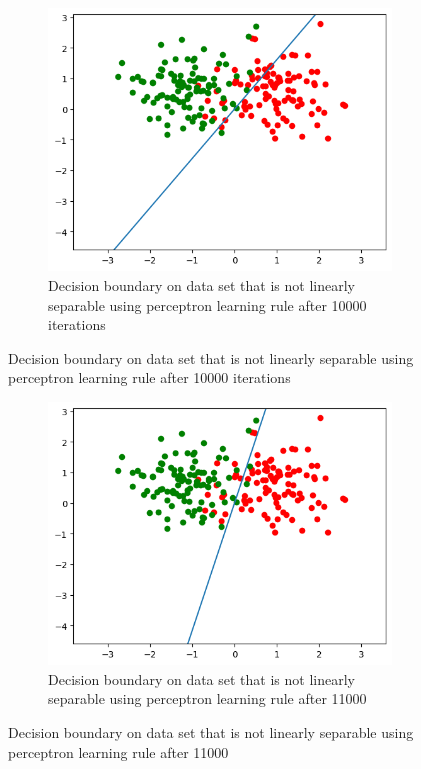 \documentclass[a4paper]{article}
\begin{document}
\begin{figure}[htb]
    \centering
    \begin{subfigure}{0.4\textwidth}
        \includegraphics[width=\textwidth]{Labs/Lab 1/Lab 1a/Results/p_non_linear10000.png}
        \caption{Decision boundary on data set that is not linearly separable  using perceptron learning rule after 10000 iterations}
        \label{fig:Decision-boundary-not-linearly-separable}
    \end{subfigure}
    \hfill
\end{figure}

\begin{figure}[htb]
    \centering
    \begin{subfigure}{0.4\textwidth}
        \includegraphics[width=\textwidth]{Labs/Lab 1/Lab 1a/Results/p_non_linear11000.png}
        \caption{Decision boundary on data set that is not linearly separable  using perceptron learning rule after 11000}
        \label{fig:Decision-boundary-not-linearly-separable}
    \end{subfigure}
    \hfill
\end{figure}
\end{document}
